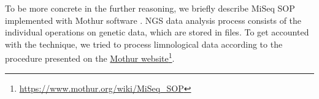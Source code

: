 \documentclass[a4paper]{jpconf}
\begin{document}
To be more concrete in the further reasoning, we briefly describe MiSeq SOP implemented with Mothur software \cite{mothur}.  NGS data analysis process consists of the individual operations on genetic data, which are stored in files. To get accounted with the technique, we tried to process limnological data \cite{mik19} according to the procedure presented on the \href{https://www.mothur.org/wiki/MiSeq_SOP}{Mothur website}\footnote{\url{https://www.mothur.org/wiki/MiSeq_SOP}}. %



\end{document}
